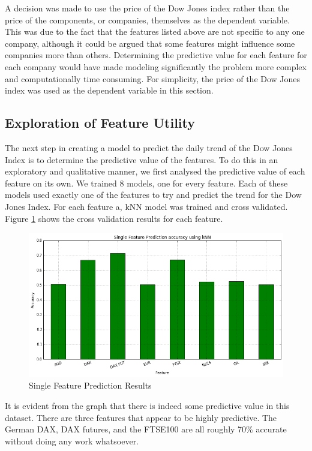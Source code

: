 \documentclass{report}
\begin{document}
A decision was made to use the price of the Dow Jones index rather than the price of the components, or companies, themselves as the dependent variable. This was due to the fact that the features listed above are not specific to any one company, although it could be argued that some features might influence some companies more than others. Determining the predictive value for each feature for each company would have made modeling significantly the problem more complex and computationally time consuming. For simplicity, the price of the Dow Jones index was used as the dependent variable in this section.

\subsection{Exploration of Feature Utility}

The next step in creating a model to predict the daily trend of the Dow Jones Index is to determine the predictive value of the features. To do this in an exploratory and qualitative manner, we first analysed the predictive value of each feature on its own. We trained 8 models, one for every feature. Each of these models used exactly one of the features to try and predict the trend for the Dow Jones Index. For each feature a, kNN model was trained and cross validated. Figure \ref{fig:single_feature_prediction} shows the cross validation results for each feature.

\begin{figure}[H]
	\caption{Single Feature Prediction Results}
	\centerline{\includegraphics[scale=0.5]{vis/single_feature_prediction.png}}
	\label{fig:single_feature_prediction}
\end{figure}

It is evident from the graph that there is indeed some predictive value in this dataset. There are three features that appear to be highly predictive. The German DAX, DAX futures, and the FTSE100 are all roughly 70\% accurate without doing any work whatsoever.
\end{document}
